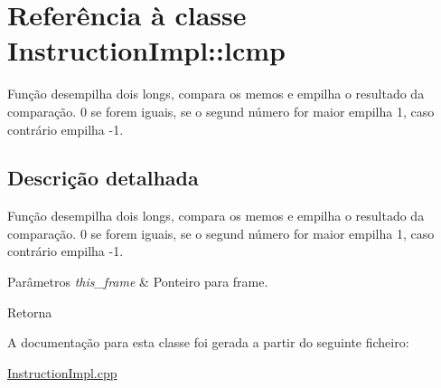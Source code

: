 \hypertarget{class_instruction_impl_1_1lcmp}{}\section{Referência à classe Instruction\+Impl\+:\+:lcmp}
\label{class_instruction_impl_1_1lcmp}


Função desempilha dois longs, compara os memos e empilha o resultado da comparação. 0 se forem iguais, se o segund número for maior empilha 1, caso contrário empilha -\/1.  




\subsection{Descrição detalhada}
Função desempilha dois longs, compara os memos e empilha o resultado da comparação. 0 se forem iguais, se o segund número for maior empilha 1, caso contrário empilha -\/1. 


\begin{DoxyParams}{Parâmetros}
{\em this\+\_\+frame} & Ponteiro para frame. \\
\hline
\end{DoxyParams}
\begin{DoxyReturn}{Retorna}

\end{DoxyReturn}


A documentação para esta classe foi gerada a partir do seguinte ficheiro\+:\begin{DoxyCompactItemize}
\item 
\hyperlink{_instruction_impl_8cpp}{Instruction\+Impl.\+cpp}\end{DoxyCompactItemize}

